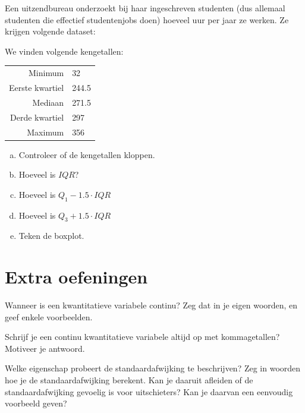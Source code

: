 \documentclass[12pt,twoside,a4paper]{article}
\begin{document}
\begin{oefening}
Een uitzendbureau onderzoekt bij haar ingeschreven studenten (dus allemaal studenten die effectief studentenjobs doen) hoeveel uur per jaar ze werken. Ze krijgen volgende dataset:


We vinden volgende kengetallen:
\begin{center}
  \begin{tabular}{r|l}
    Minimum & 32\\
    Eerste kwartiel & 244.5\\
    Mediaan & 271.5\\
    Derde kwartiel & 297\\
    Maximum & 356
  \end{tabular}
\end{center}

\begin{enumerate}[(a)]
  \item Controleer of de kengetallen kloppen.
  \item Hoeveel is $IQR$?
  \item Hoeveel is $Q_1-1.5\cdot IQR$
  \item Hoeveel is $Q_3+1.5\cdot IQR$
  \item Teken de boxplot.
\end{enumerate}
\end{oefening}

\cleardoublepage
\section{Extra oefeningen}

\begin{oefening}
Wanneer is een kwantitatieve variabele continu? Zeg dat in je eigen woorden, en geef
enkele voorbeelden.
\end{oefening}

\begin{oefening}
Schrijf je een continu kwantitatieve variabele altijd op met kommagetallen? Motiveer je
antwoord.
\end{oefening}

\begin{oefening}
Welke eigenschap probeert de standaardafwijking te beschrijven? Zeg in woorden hoe je de
standaardafwijking berekent. Kan je daaruit afleiden of de standaardafwijking gevoelig is
voor uitschieters? Kan je daarvan een eenvoudig voorbeeld geven?
\end{oefening}
\end{document}
